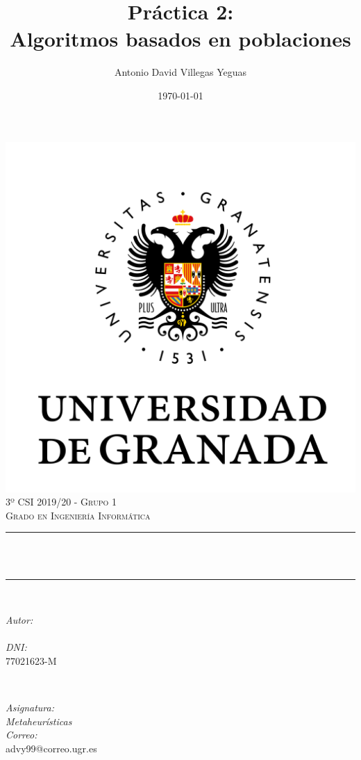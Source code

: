 \documentclass[12pt, spanish]{article}
\title{Práctica 2:\\
Algoritmos basados en poblaciones  \hspace{0.05cm} }
\author{Antonio David Villegas Yeguas}
\date{\today}
\makeatletter
\let\thetitle\@title
\let\theauthor\@author
\makeatother
\begin{document}

\begin{titlepage}
    \centering
    \vspace*{0.3 cm}
    \includegraphics[scale = 0.50]{ugr.png}\\[0.7 cm]
    \textsc{\large 3º CSI 2019/20 - Grupo 1}\\[0.5 cm]            
    \textsc{\large Grado en Ingeniería Informática}\\[0.5 cm]              
    \rule{\linewidth}{0.2 mm} \\[0.2 cm]
    { \huge \bfseries \thetitle}\\
    \rule{\linewidth}{0.2 mm} \\[1 cm]
    
    \begin{minipage}{0.4\textwidth}
        \begin{flushleft} \large
            \emph{Autor:}\\
            \theauthor\\ 
			 \emph{DNI:}\\
            77021623-M
            \end{flushleft}
            \end{minipage}~
            \begin{minipage}{0.4\textwidth}
            \begin{flushright} \large
            \emph{Asignatura: \\
            Metaheurísticas}   \\     
            \emph{Correo:}\\
            advy99@correo.ugr.es           
        \end{flushright}
    \end{minipage}\\[0.5cm]
  

\end{titlepage}
\end{document}
